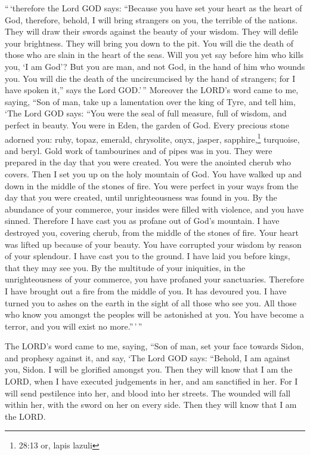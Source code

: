  ``\,`therefore the Lord GOD says: ``Because you have set
your heart as the heart of God,  therefore, behold, I will
bring strangers on you, the terrible of the nations. They will draw
their swords against the beauty of your wisdom. They will defile your
brightness.  They will bring you down to the pit. You will
die the death of those who are slain in the heart of the seas.
 Will you yet say before him who kills you, `I am God'? But
you are man, and not God, in the hand of him who wounds you.
 You will die the death of the uncircumcised by the hand of
strangers; for I have spoken it,'' says the Lord GOD.'\,'' 
Moreover the LORD's word came to me, saying,  ``Son of man,
take up a lamentation over the king of Tyre, and tell him, `The Lord GOD
says: ``You were the seal of full measure, full of wisdom, and perfect
in beauty.  You were in Eden, the garden of God. Every
precious stone adorned you: ruby, topaz, emerald, chrysolite, onyx,
jasper, sapphire,\footnote{28:13 or, lapis lazuli} turquoise, and beryl.
Gold work of tambourines and of pipes was in you. They were prepared in
the day that you were created.  You were the anointed
cherub who covers. Then I set you up on the holy mountain of God. You
have walked up and down in the middle of the stones of fire.
 You were perfect in your ways from the day that you were
created, until unrighteousness was found in you.  By the
abundance of your commerce, your insides were filled with violence, and
you have sinned. Therefore I have cast you as profane out of God's
mountain. I have destroyed you, covering cherub, from the middle of the
stones of fire.  Your heart was lifted up because of your
beauty. You have corrupted your wisdom by reason of your splendour. I
have cast you to the ground. I have laid you before kings, that they may
see you.  By the multitude of your iniquities, in the
unrighteousness of your commerce, you have profaned your sanctuaries.
Therefore I have brought out a fire from the middle of you. It has
devoured you. I have turned you to ashes on the earth in the sight of
all those who see you.  All those who know you amongst the
peoples will be astonished at you. You have become a terror, and you
will exist no more.''\,'\,''

 The LORD's word came to me, saying,  ``Son of
man, set your face towards Sidon, and prophesy against it, 
and say, `The Lord GOD says: ``Behold, I am against you, Sidon. I will
be glorified amongst you. Then they will know that I am the LORD, when I
have executed judgements in her, and am sanctified in her. 
For I will send pestilence into her, and blood into her streets. The
wounded will fall within her, with the sword on her on every side. Then
they will know that I am the LORD.

